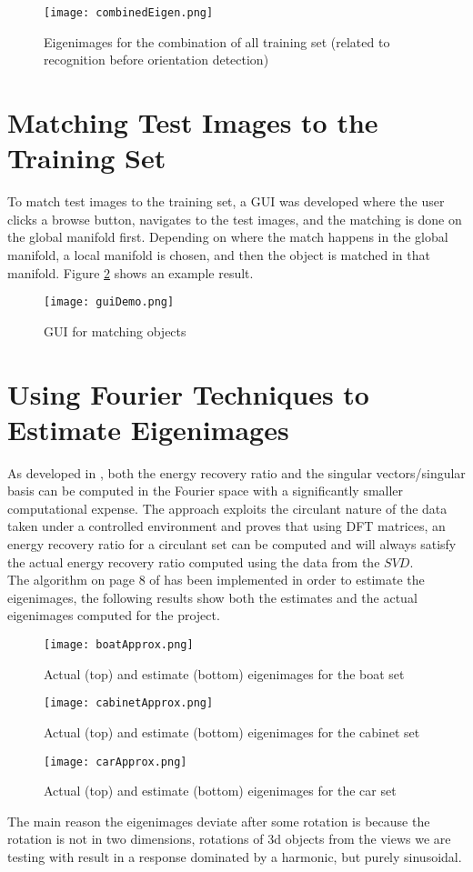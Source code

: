 \documentclass[10pt,twocolumn,letterpaper]{article}
\begin{document}
\begin{figure}
\texttt{[image: combinedEigen.png]}
\caption{Eigenimages for the combination of all training set (related to recognition before orientation detection)}
\label{fig:eigenCombined}
\end{figure}
\section{Matching Test Images to the Training Set}
To match test images to the training set, a GUI was developed where the user clicks a browse button, navigates to the test images, and the matching is done on the global manifold first. Depending on where the match happens in the global manifold, a local manifold is chosen, and then the object is matched in that manifold. Figure \ref{fig:guiDemo} shows an example result.
\begin{figure}
\texttt{[image: guiDemo.png]}
\caption{GUI for matching objects}
\label{fig:guiDemo}
\end{figure}
\section{Using Fourier Techniques to Estimate Eigenimages}
As developed in \cite{Chang}, both the energy recovery ratio and the singular vectors/singular basis can be computed in the Fourier space with a significantly smaller computational expense. The approach exploits the circulant nature of the data taken under a controlled environment and proves that using DFT matrices, an energy recovery ratio for a circulant set can be computed and will always satisfy the actual energy recovery ratio computed using the data from the $SVD$.\\
The algorithm on page 8 of \cite{Chang} has been implemented in order to estimate the eigenimages, the following results show both the estimates and the actual eigenimages computed for the project.
\begin{figure}
\texttt{[image: boatApprox.png]}
\caption{Actual (top) and estimate (bottom) eigenimages for the boat set}
\label{fig:boatApprox}
\end{figure}

\begin{figure}
\texttt{[image: cabinetApprox.png]}
\caption{Actual (top) and estimate (bottom) eigenimages for the cabinet set}
\label{fig:cabinetApprox}
\end{figure}

\begin{figure}
\texttt{[image: carApprox.png]}
\caption{Actual (top) and estimate (bottom) eigenimages for the car set}
\label{fig:carApprox}
\end{figure}
The main reason the eigenimages deviate after some rotation is because the rotation is not in two dimensions, rotations of 3d objects from the views we are testing with result in a response dominated by a harmonic, but purely sinusoidal.
{\small


}
\end{document}
